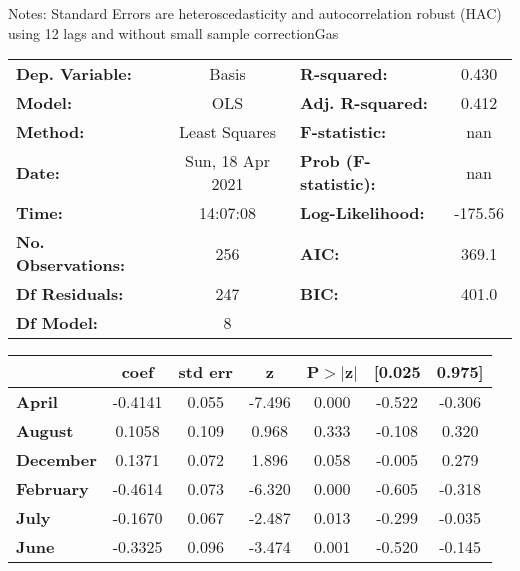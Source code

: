 Notes: \newline
 [1] Standard Errors are heteroscedasticity and autocorrelation robust (HAC) using 12 lags and without small sample correctionGas\begin{center}
\begin{tabular}{lclc}
\toprule
\textbf{Dep. Variable:}    &      Basis       & \textbf{  R-squared:         } &     0.430   \\
\textbf{Model:}            &       OLS        & \textbf{  Adj. R-squared:    } &     0.412   \\
\textbf{Method:}           &  Least Squares   & \textbf{  F-statistic:       } &       nan   \\
\textbf{Date:}             & Sun, 18 Apr 2021 & \textbf{  Prob (F-statistic):} &      nan    \\
\textbf{Time:}             &     14:07:08     & \textbf{  Log-Likelihood:    } &   -175.56   \\
\textbf{No. Observations:} &         256      & \textbf{  AIC:               } &     369.1   \\
\textbf{Df Residuals:}     &         247      & \textbf{  BIC:               } &     401.0   \\
\textbf{Df Model:}         &           8      & \textbf{                     } &             \\
\bottomrule
\end{tabular}
\begin{tabular}{lcccccc}
                  & \textbf{coef} & \textbf{std err} & \textbf{z} & \textbf{P$> |$z$|$} & \textbf{[0.025} & \textbf{0.975]}  \\
\midrule
\textbf{April}    &      -0.4141  &        0.055     &    -7.496  &         0.000        &       -0.522    &       -0.306     \\
\textbf{August}   &       0.1058  &        0.109     &     0.968  &         0.333        &       -0.108    &        0.320     \\
\textbf{December} &       0.1371  &        0.072     &     1.896  &         0.058        &       -0.005    &        0.279     \\
\textbf{February} &      -0.4614  &        0.073     &    -6.320  &         0.000        &       -0.605    &       -0.318     \\
\textbf{July}     &      -0.1670  &        0.067     &    -2.487  &         0.013        &       -0.299    &       -0.035     \\
\textbf{June}     &      -0.3325  &        0.096     &    -3.474  &         0.001        &       -0.520    &       -0.145     \\

\end{tabular}
\end{center}
